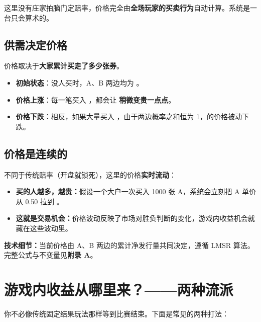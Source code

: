 \documentclass[11pt,a4paper,twoside]{article}
\begin{document}

这里没有庄家拍脑门定赔率，价格完全由\textbf{全场玩家的买卖行为}自动计算。系统是一台只会算术的。

\subsection{供需决定价格}

价格取决于\textbf{大家累计买走了多少张券}。

\begin{itemize}
  \item \textbf{初始状态}：没人买时，A、B 两边均为 。
  \item \textbf{价格上涨}：每一笔买入 \Reimu，都会让 \Acard\textbf{稍微变贵一点点}。
  \item \textbf{价格下跌}：相反，如果大量买入 \Marisa，由于两边概率之和恒为 1，\Reimu 的价格被动下跌。
\end{itemize}

\subsection{价格是连续的}

不同于传统赔率（开盘就锁死），这里的价格\textbf{实时流动}：

\begin{itemize}
  \item \textbf{买的人越多，越贵：}假设一个大户一次买入 1000 张 A，系统会立刻把 A 单价从 0.50 拉到 。
  \item \textbf{这就是交易机会：}价格波动反映了市场对胜负判断的变化，游戏内收益机会就藏在这些波动里。
\end{itemize}

\begin{notebox}
\textbf{技术细节：}\;当前价格由 A、B 两边的累计净发行量共同决定，遵循 LMSR 算法。完整公式与不变量见\textbf{附录 A}。
\end{notebox}

\section{游戏内收益从哪里来？——两种流派}

你不必像传统固定结果玩法那样等到比赛结束。下面是常见的两种打法：
\end{document}
